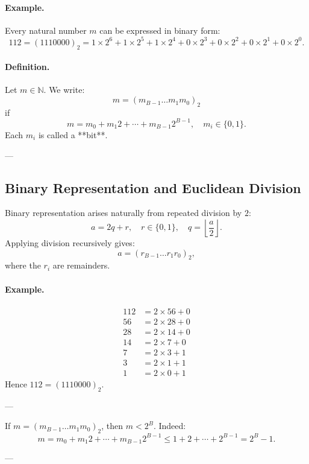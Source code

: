 \paragraph{Example.}
Every natural number \( m \) can be expressed in binary form:
\[
112 = (1110000)_2 = 1 \times 2^6 + 1 \times 2^5 + 1 \times 2^4 + 0 \times 2^3 + 0 \times 2^2 + 0 \times 2^1 + 0 \times 2^0.
\]

\paragraph{Definition.}
Let \( m \in \mathbb{N} \).  
We write:
\[
m = (m_{B-1} \ldots m_1 m_0)_2
\]
if
\[
m = m_0 + m_1 2 + \cdots + m_{B-1} 2^{B-1}, \quad m_i \in \{0, 1\}.
\]
Each \(m_i\) is called a **bit**.

---

\subsection{Binary Representation and Euclidean Division}

Binary representation arises naturally from repeated division by \(2\):
\[
a = 2q + r, \quad r \in \{0,1\}, \quad q = \left\lfloor \frac{a}{2} \right\rfloor.
\]
Applying division recursively gives:
\[
a = (r_{B-1} \ldots r_1 r_0)_2,
\]
where the \(r_i\) are remainders.

\paragraph{Example.}
\[
\begin{aligned}
112 &= 2 \times 56 + 0 \\
56  &= 2 \times 28 + 0 \\
28  &= 2 \times 14 + 0 \\
14  &= 2 \times 7  + 0 \\
7   &= 2 \times 3  + 1 \\
3   &= 2 \times 1  + 1 \\
1   &= 2 \times 0  + 1
\end{aligned}
\]
Hence \(112 = (1110000)_2.\)

---

\begin{remark}
If \(m = (m_{B-1} \ldots m_1 m_0)_2\), then \(m < 2^B\).  
Indeed:
\[
m = m_0 + m_1 2 + \cdots + m_{B-1} 2^{B-1} \le 1 + 2 + \cdots + 2^{B-1} = 2^B - 1.
\]
\end{remark}

---

